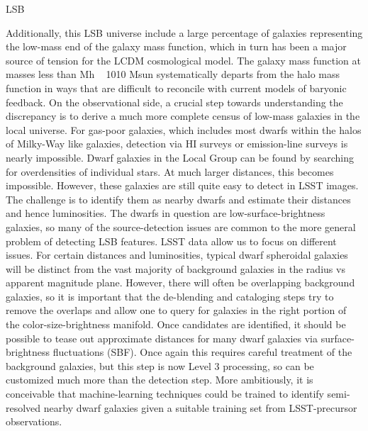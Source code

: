 \begin{tasklist}{LSB}
\begin{task}
{Additionally, this LSB universe include a large percentage of galaxies representing the low-mass end of the galaxy mass function, which in turn has been a major source of tension for the LCDM cosmological model. The galaxy mass function at masses less than Mh  ~ 1010 Msun systematically departs from the halo mass function in ways that are difficult to reconcile with current models of baryonic feedback. On the observational side, a crucial step towards understanding the discrepancy is to derive a much more complete census of low-mass galaxies in the local universe. For gas-poor galaxies, which includes most dwarfs within the halos of Milky-Way like galaxies, detection via HI surveys or emission-line surveys is nearly impossible. Dwarf galaxies in the Local Group can be found by searching for overdensities of individual stars. At much larger distances, this becomes impossible. However, these galaxies are still quite easy to detect in LSST images.
\\
The challenge is to identify them as nearby dwarfs and estimate their distances and hence luminosities. The dwarfs in question are low-surface-brightness galaxies, so many of the source-detection issues are common to the more general problem of detecting LSB features. LSST data allow us to focus on different issues. For certain distances and luminosities, typical dwarf spheroidal galaxies will be distinct from the vast majority of background galaxies in the radius vs apparent magnitude plane. However, there will often be overlapping background galaxies, so it is important that the de-blending and cataloging steps try to remove the overlaps and allow one to query for galaxies in the right portion of the color-size-brightness manifold. Once candidates are identified, it should be possible to tease out approximate distances for many dwarf galaxies via surface-brightness fluctuations (SBF). Once again this requires careful treatment of the background galaxies, but this step is now Level 3 processing, so can be customized much more than the detection step. More ambitiously, it is conceivable that machine-learning techniques could be trained to identify semi-resolved nearby dwarf galaxies given a suitable training set from LSST-precursor observations.
\\
}
\end{task}
\end{tasklist}
